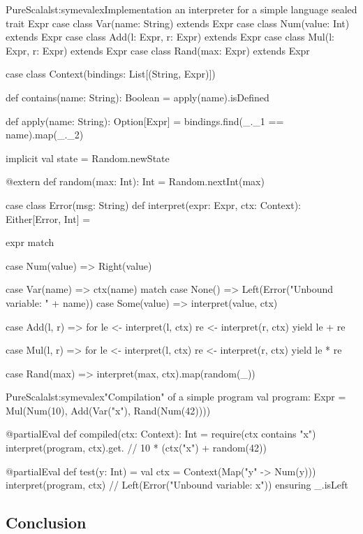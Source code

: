 \documentclass[a4paper,twoside]{article}
\begin{document}
\begin{Code}{PureScala}{lst:symevalex}{Implementation an interpreter for a simple language}
sealed trait Expr
case class Var(name: String)     extends Expr
case class Num(value: Int)       extends Expr
case class Add(l: Expr, r: Expr) extends Expr
case class Mul(l: Expr, r: Expr) extends Expr
case class Rand(max: Expr)       extends Expr

case class Context(bindings: List[(String, Expr)]) {
  def contains(name: String): Boolean =
  	apply(name).isDefined

  def apply(name: String): Option[Expr] =
    bindings.find(_._1 == name).map(_._2)
}

implicit val state = Random.newState

@extern
def random(max: Int): Int = {
  Random.nextInt(max)
}

case class Error(msg: String)
def interpret(expr: Expr, ctx: Context): Either[Error, Int] = {
  expr match {
    case Num(value) => Right(value)

    case Var(name)  => ctx(name) match { 
      case None()      => Left(Error("Unbound variable: " + name))
      case Some(value) => interpret(value, ctx)
    }

    case Add(l, r)  => for {
      le <- interpret(l, ctx)
      re <- interpret(r, ctx)
    } yield le + re

    case Mul(l, r)  => for {
      le <- interpret(l, ctx)
      re <- interpret(r, ctx)
    } yield le * re

    case Rand(max) =>
      interpret(max, ctx).map(random(_))
  }
}
\end{Code}

\begin{Code}{PureScala}{lst:symevalex}{"Compilation" of a simple program}
val program: Expr = Mul(Num(10), Add(Var("x"), Rand(Num(42))))

@partialEval
def compiled(ctx: Context): Int = {
  require(ctx contains "x")
  interpret(program, ctx).get.            // 10 * (ctx("x") + random(42))
}

@partialEval
def test(y: Int) = {
  val ctx = Context(Map("y" -> Num(y)))
  interpret(program, ctx)                 // Left(Error("Unbound variable: x"))
} ensuring { _.isLeft }
\end{Code}

\subsection{Conclusion}
\end{document}
